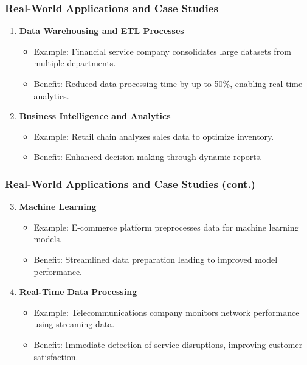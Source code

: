 \documentclass[aspectratio=169]{beamer}
\begin{document}
\begin{frame}
    \frametitle{Real-World Applications and Case Studies}
    \begin{enumerate}
        \item \textbf{Data Warehousing and ETL Processes}
            \begin{itemize}
                \item Example: Financial service company consolidates large datasets from multiple departments.
                \item Benefit: Reduced data processing time by up to 50\%, enabling real-time analytics.
            \end{itemize}
        
        \item \textbf{Business Intelligence and Analytics}
            \begin{itemize}
                \item Example: Retail chain analyzes sales data to optimize inventory.
                \item Benefit: Enhanced decision-making through dynamic reports.
            \end{itemize}
    \end{enumerate}
\end{frame}

\begin{frame}
    \frametitle{Real-World Applications and Case Studies (cont.)}
    \begin{enumerate}
        \setcounter{enumi}{2}
        \item \textbf{Machine Learning}
            \begin{itemize}
                \item Example: E-commerce platform preprocesses data for machine learning models.
                \item Benefit: Streamlined data preparation leading to improved model performance.
            \end{itemize}
        
        \item \textbf{Real-Time Data Processing}
            \begin{itemize}
                \item Example: Telecommunications company monitors network performance using streaming data.
                \item Benefit: Immediate detection of service disruptions, improving customer satisfaction.
            \end{itemize}
    \end{enumerate}
\end{frame}
\end{document}
